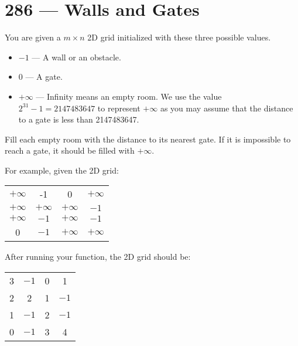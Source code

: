 \section{286 --- Walls and Gates}
You are given a $m \times n$ 2D grid initialized with these three possible values.
\begin{itemize}
\item $-1$  ---  A wall or an obstacle.
\item $0$ --- A gate.
\item $+\infty$ --- Infinity means an empty room. We use the value $2^{31} - 1 = 2147483647$ to represent $+\infty$ as you may assume that the distance to a gate is less than 2147483647.
\end{itemize}
Fill each empty room with the distance to its nearest gate. If it is impossible to reach a gate, it should be filled with $+\infty$.
\par
For example, given the 2D grid:
\begin{table}[H]
\begin{tabular}{cccc}
$+\infty$ & -1 & 0 & $+\infty$\\
$+\infty$ & $+\infty$ & $+\infty$ & $-1$\\
$+\infty$ &  $-1$ & $+\infty$ & $-1$\\
0 & $-1$ & $+\infty$ & $+\infty$
\end{tabular}
\end{table}

After running your function, the 2D grid should be:

\begin{table}[H]
\begin{tabular}{cccc}
  3 & $-1$ &  0 &  1\\
  2 &  2 &  1 & $-1$\\
  1 & $-1$ &  2 & $-1$\\
  0 & $-1$ &  3 &  4
\end{tabular}
\end{table}
